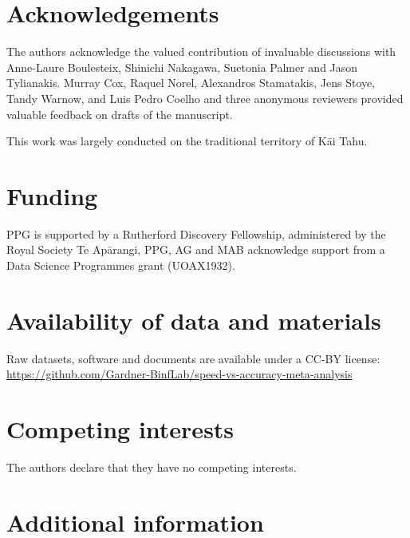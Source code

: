 \documentclass{bmcart}
\begin{document}
\begin{backmatter}

\section*{Acknowledgements}
The authors acknowledge the valued contribution of invaluable
discussions with Anne-Laure Boulesteix, Shinichi Nakagawa, Suetonia
Palmer and Jason Tylianakis. Murray Cox, Raquel
Norel, Alexandros Stamatakis, Jens Stoye, Tandy Warnow, and 
{\color{black}Luis Pedro Coelho and three anonymous reviewers} provided
valuable feedback on drafts of the manuscript.

This work was largely conducted on the traditional territory of K\=ai Tahu.

\section*{Funding}
PPG is supported by a Rutherford Discovery Fellowship,
administered by the Royal Society Te Ap\=arangi, 
PPG, AG and MAB acknowledge support from a Data Science Programmes grant
(UOAX1932).

\section*{Availability of data and materials}
Raw datasets, software and documents are available under a CC-BY license:\\
\fussy
\url{https://github.com/Gardner-BinfLab/speed-vs-accuracy-meta-analysis}
\sloppy

\section*{Competing interests}
The authors declare that they have no competing interests.

\section*{Additional information}


\end{backmatter}
\end{document}
